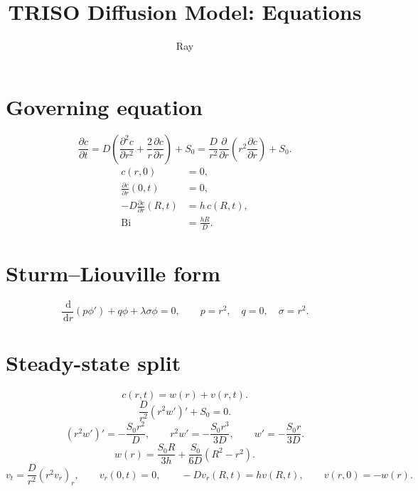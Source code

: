 \documentclass[11pt,a4paper]{article}
\title{TRISO Diffusion Model: Equations}
\author{Ray}
\date{}
\newcommand{\Bi}{\mathrm{Bi}}
\newcommand{\dd}{\,\mathrm{d}}
\begin{document}
\maketitle

\section{Governing equation}
\begin{equation}
\frac{\partial c}{\partial t}
= D\left(\frac{\partial^2 c}{\partial r^2}+\frac{2}{r}\frac{\partial c}{\partial r}\right)+S_0
=\frac{D}{r^2}\frac{\partial}{\partial r}\left(r^2\frac{\partial c}{\partial r}\right)+S_0.
\end{equation}
\begin{align}
c(r,0)&=0,\\
\frac{\partial c}{\partial r}(0,t)&=0,\\
-D\frac{\partial c}{\partial r}(R,t)&=h\,c(R,t),\\
\Bi&=\frac{hR}{D}.
\end{align}

\section{Sturm--Liouville form}
\begin{equation}
\frac{\dd}{\dd r}\left(p\phi'\right)+q\phi+\lambda\sigma\phi=0,
\qquad p=r^2,\quad q=0,\quad \sigma=r^2.
\end{equation}

\section{Steady-state split}
\begin{equation}
c(r,t)=w(r)+v(r,t).
\end{equation}
\begin{equation}
\frac{D}{r^2}(r^2w')'+S_0=0.
\end{equation}
\begin{equation}
(r^2w')'=-\frac{S_0r^2}{D},\qquad
r^2w'=-\frac{S_0r^3}{3D},\qquad
w'=-\frac{S_0r}{3D}.
\end{equation}
\begin{equation}
\boxed{w(r)=\frac{S_0R}{3h}+\frac{S_0}{6D}(R^2-r^2)}.
\end{equation}
\begin{equation}
v_t=\frac{D}{r^2}(r^2v_r)_r,\qquad
v_r(0,t)=0,\qquad -Dv_r(R,t)=hv(R,t),\qquad v(r,0)=-w(r).
\end{equation}
\end{document}
